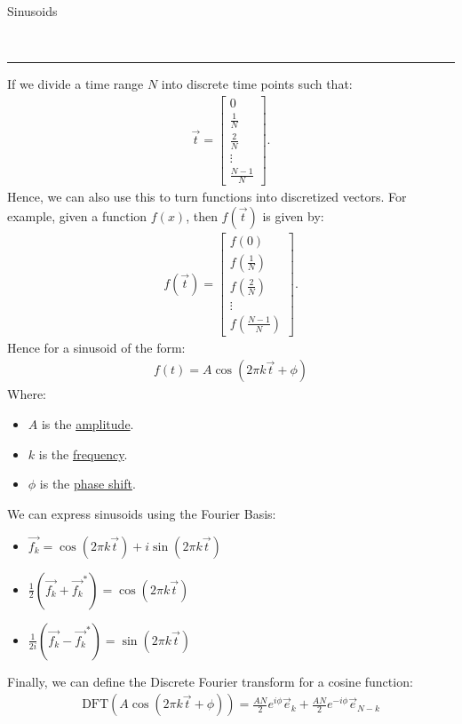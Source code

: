 \documentclass{article}
\newcommand{\header}[1]{\begin{large}\noindent #1\end{large}\\\rule{\textwidth}{0.5pt}}
\begin{document}
\header{Sinusoids}
If we divide a time range $N$ into discrete time points such that:
\begin{align*}
    \vec{t} = \begin{bmatrix}
        0\\
        \frac{1}{N}\\
        \frac{2}{N}\\
        \vdots \\
        \frac{N - 1}{N}
    \end{bmatrix}.
\end{align*}
Hence, we can also use this to turn functions into discretized vectors. For example, given 
a function $f(x)$, then $f(\vec{t})$ is given by:
\begin{align*}
    f(\vec{t}) = 
    \begin{bmatrix}
        f(0)\\
        f\left(\frac{1}{N}\right)\\
        f\left(\frac{2}{N}\right)\\
        \vdots\\
        f\left(\frac{N-1}{N}\right)
    \end{bmatrix}.
\end{align*}
Hence for a sinusoid of the form:
\begin{align*}
    f(t) = A\cos(2\pi k\vec{t} + \phi)
\end{align*}
Where:
\begin{itemize}
    \item $A$ is the \underline{amplitude}.
    \item $k$ is the \underline{frequency}.
    \item $\phi$ is the \underline{phase shift}.
\end{itemize}
We can express sinusoids using the Fourier Basis:
\begin{itemize}
    \item $\vec{f_k} = \cos(2 \pi k \vec{t}) + i \sin (2 \pi k \vec{t})$
    \item $\frac{1}{2}\left(\vec{f_k} + {\vec{f_k}}^* \right) = \cos(2\pi k \vec{t})$
    \item $\frac{1}{2i}\left(\vec{f_k} - \vec{f_k}^*\right) = \sin(2\pi k\vec{t})$
\end{itemize}
Finally, we can define the Discrete Fourier transform for a cosine function:
\begin{align*}
    \textrm{DFT}(A \cos (2\pi k \vec{t} + \phi)) = \frac{AN}{2}e^{i\phi}\vec{e}_k + \frac{AN}{2}e^{-i\phi}\vec{e}_{N - k}
\end{align*}
\end{document}
